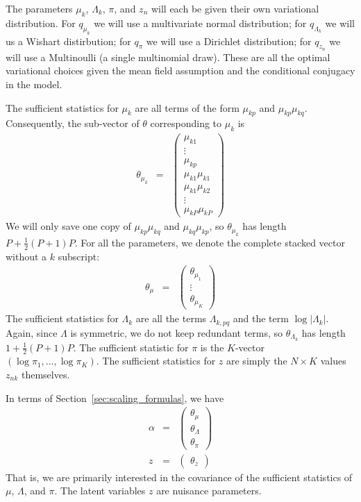 \documentclass{article}\usepackage[]{graphicx}\usepackage[]{color}
\newcommand{\mysec}[1]{Section~\ref{sec:#1}}
\theoremstyle{plain}
\begin{document}
The parameters $\mu_{k}$, $\Lambda_{k}$, $\pi$, and $z_{n}$ will
each be given their own variational distribution.  For $q_{\mu_k}$ we will
use a multivariate normal distribution; for $q_{\Lambda_{k}}$ we will
us a Wishart distirbution; for $q_{\pi}$ we will use a Dirichlet distribution;
for $q_{z_{n}}$ we will use a Multinoulli (a single multinomial draw).  These
are all the optimal variational choices given the mean field assumption and
the conditional conjugacy in the model.

The sufficient statistics for $\mu_{k}$ are all terms of the form
$\mu_{kp}$ and $\mu_{kp}\mu_{kq}$. Consequently, the sub-vector
of $\theta$ corresponding to $\mu_{k}$ is
%
\begin{eqnarray*}
\theta_{\mu_{k}} & = & \left(\begin{array}{c}
\mu_{k1}\\
\vdots\\
\mu_{kp}\\
\mu_{k1}\mu_{k1}\\
\mu_{k1}\mu_{k2}\\
\vdots\\
\mu_{kP}\mu_{kP}
\end{array}\right)
\end{eqnarray*}
%
We will only save one copy of $\mu_{kp}\mu_{kq}$ and $\mu_{kq}\mu_{kp}$,
so $\theta_{\mu_{k}}$ has length $P+\frac{1}{2}\left(P+1\right)P$.
For all the parameters, we denote the complete stacked vector without
a $k$ subscript:
%
\begin{eqnarray*}
\theta_{\mu} & = & \left(\begin{array}{c}
\theta_{\mu_{1}}\\
\vdots\\
\theta_{\mu_{K}}
\end{array}\right)
\end{eqnarray*}
%
The sufficient statistics for $\Lambda_{k}$ are all the terms $\Lambda_{k,pq}$
and the term $\log\left|\Lambda_{k}\right|$. Again, since $\Lambda$ is
symmetric, we do not keep redundant terms, so $\theta_{\Lambda_{k}}$ has length
$1+\frac{1}{2}\left(P+1\right)P$. The sufficient statistic for $\pi$ is the
$K$-vector $\left(\log\pi_{1},...,\log\pi_{K}\right)$. The sufficient statistics
for $z$ are simply the $N\times K$ values $z_{nk}$ themselves.

In terms of \mysec{scaling_formulas}, we have
%
\begin{eqnarray*}
\alpha & = & \left(\begin{array}{c}
\theta_{\mu}\\
\theta_{\Lambda}\\
\theta_{\pi}
\end{array}\right)\\
z & = & \left(\begin{array}{c}
\theta_{z}\end{array}\right)
\end{eqnarray*}
%
That is, we are primarily interested in the covariance of the sufficient
statistics of $\mu$, $\Lambda$, and $\pi$.  The latent variables $z$ are
nuisance parameters.
\end{document}
